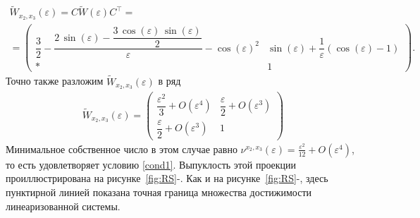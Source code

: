 \documentclass[../main.tex]{subfiles}
\begin{document}
\begin{enumerate}
\begin{gather*}
			\widetilde{W}_{x_2,x_3}(\varepsilon) =  C \widetilde{W} (\varepsilon) C^{\top}  =\\=\begin{pmatrix}
				\dfrac{3}{2}-\dfrac{2\,\sin\left(\varepsilon \right)-\dfrac{3\,\cos\left(\varepsilon \right)\,\sin\left(\varepsilon \right)}{2}}{\varepsilon }-{\cos\left(\varepsilon \right)}^2 & \sin\left(\varepsilon \right)+\dfrac{1}{\varepsilon } \left(\cos\left(\varepsilon \right)-1 \right)\\[8pt]
				* & 
				1 
			\end{pmatrix}.
		\end{gather*}
		Точно также разложим $ \widetilde{W}_{x_2,x_3}(\varepsilon) $ в ряд
		\begin{gather*}
			\widetilde{W}_{x_2,x_3}(\varepsilon)  = \begin{pmatrix}
				\dfrac{\varepsilon^2}{3} + O(\varepsilon^4) &
				\dfrac{\varepsilon }{2} + O(\varepsilon^3) \\[8pt]
				\dfrac{\varepsilon }{2} + O(\varepsilon^3) & 1
			\end{pmatrix}
		\end{gather*}
		Минимальное собственное число в этом случае равно $ \nu^{x_2,x_3}(\varepsilon) = \frac{\varepsilon^2}{12} + O(\varepsilon^4) $, то есть удовлетворяет условию \eqref{cond1}. Выпуклость этой проекции проиллюстрирована на рисунке~\ref{fig:RS}-.  Как и на рисунке~\ref{fig:RS}-, здесь пунктирной линией показана точная граница множества достижимости линеаризованной системы.
	\end{enumerate}
\end{document}
